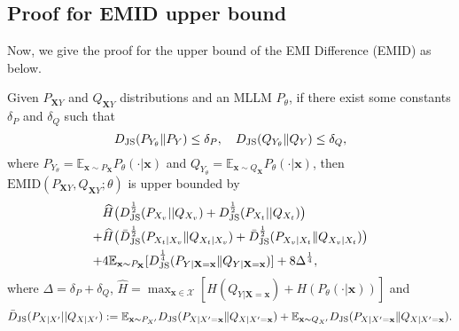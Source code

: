 \subsection{Proof for EMID upper bound}
Now, we give the proof for the upper bound of the EMI Difference (EMID) as below.
\vspace{0.2cm}
\begin{theorem}\label{thm:emid_bound_appendix}
Given $P_{\mathbf{X}Y}$ and $Q_{\mathbf{X}Y}$ distributions and an MLLM $P_{{\theta}}$, if there exist some constants $\delta_{P}$ and $\delta_{Q}$ such that
\begin{equation*}
    D_{\rm JS}(P_{Y_{{\theta}}}\|P_{Y})\leq \delta_{P},~~~ D_{\rm JS}(Q_{Y_{{\theta}}}\|Q_{Y})\leq \delta_{Q},
\end{equation*}
where $P_{Y_{\theta}}=\mathbb{E}_{\mathbf{x}\sim P_{\mathbf{X}}} P_{{\theta}}(\cdot|\mathbf{x})$ and $Q_{Y_{\theta}}=\mathbb{E}_{\mathbf{x}\sim Q_{\mathbf{X}}} P_{{\theta}}(\cdot|\mathbf{x})$, then $\text{EMID}(P_{\mathbf{X}Y},Q_{\mathbf{X}Y};\theta)$ is upper bounded by
\begin{equation} \label{eq:emid_bound_appendix}
    \begin{split}
    & \widehat{H}\big({ D^{\frac{1}{2}}_{\rm JS}(P_{X_{v}}||Q_{X_{v}}) + D^{\frac{1}{2}}_{\rm JS}(P_{X_{t}}||Q_{X_{t}})} \big) \nonumber\\
    +&\widehat{H}\big({\bar{D}^{\frac{1}{2}}_{\rm JS}(P_{X_{t}|X_{v}}\|Q_{X_{t}|X_{v}})+\bar{D}^{\frac{1}{2}}_{\rm JS}(P_{X_{v}|X_{t}}\|Q_{X_{v}|X_{t}})} \big)\nonumber\\
    +&4  \mathbb{E}_{\mathbf{x}\sim P_{\mathbf{X}} } [D^{\frac{1}{4}}_{\rm JS}(P_{Y|\mathbf{X}=\mathbf{x}}\|Q_{Y|\mathbf{X}=\mathbf{x}})] + 8\Delta^{\frac{1}{4}},
    \end{split}
\end{equation}
\normalsize
where $\Delta=\delta_{P}+\delta_{Q}$, $ \widehat{H}=\max_{\mathbf{x}\in\mathcal{X}} [H(Q_{Y|\mathbf{X}=\mathbf{x}})+H(P_{\theta}(\cdot|\mathbf{x}))]$ and \begin{equation*}
\begin{split}
    \bar{D}_{\rm JS}(P_{X|X'}||Q_{X|X'}) :=\mathbb{E}_{\mathbf{x}\sim P_{X'}}D_{\rm JS}(P_{X|{X'}=\mathbf{x}}\|Q_{X|{X'}=\mathbf{x}})+\mathbb{E}_{\mathbf{x}\sim Q _{X'}}D_{\rm JS}(P_{X|{X'}=\mathbf{x}}\|Q_{X|{X'}=\mathbf{x}}).
    \end{split}
\end{equation*}
\end{theorem}

